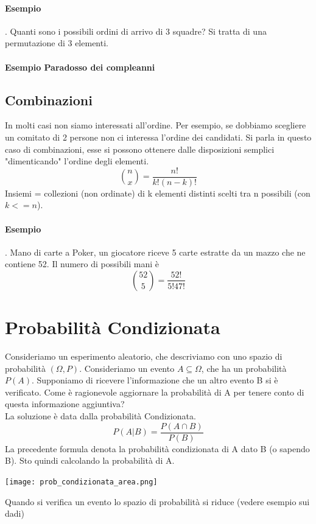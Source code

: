 \documentclass[12pt, a4paper, openany]{book}
\begin{document}
\paragraph{Esempio}. Quanti sono i possibili ordini di arrivo di 3 squadre?
Si tratta di una permutazione di 3 elementi.
\paragraph{Esempio Paradosso dei compleanni}

\subsection{Combinazioni}
In molti casi non siamo interessati all'ordine. 
Per esempio, se dobbiamo scegliere un comitato di 2 persone non ci interessa l'ordine 
dei candidati.
Si parla in questo caso di combinazioni, esse si possono ottenere dalle disposizioni semplici
"dimenticando" l'ordine degli elementi.
\begin{equation}
    {n \choose x} = \frac{n!}{k!(n-k)!}
\end{equation}
Insiemi = collezioni (non ordinate) di k elementi distinti scelti tra n possibili (con $k <= n$).
\paragraph{Esempio}. Mano di carte a Poker, un giocatore riceve 5 carte estratte da un mazzo che
ne contiene 52. Il numero di possibili mani è
\begin{equation}
    {52 \choose 5} = \frac{52!}{5!47!}
\end{equation} 

\section{Probabilità Condizionata}
Consideriamo un esperimento aleatorio, che descriviamo con uno spazio di probabilità $(\Omega, P)$.
Consideriamo un evento $A \subseteq \Omega$, che ha un probabilità $P(A)$.
Supponiamo di ricevere l'informazione che un altro evento B si è verificato.
Come è ragionevole aggiornare la probabilità di A per tenere conto di questa informazione aggiuntiva?
\\La soluzione è data dalla probabilità Condizionata.
\begin{equation}
    P(A|B) = \frac{P(A \cap B)}{P(B)}
\end{equation}
La precedente formula denota la probabilità condizionata di A dato B (o sapendo B).
Sto quindi calcolando la probabilità di A.
\begin{center}
    \texttt{[image: prob\_condizionata\_area.png]}    
\end{center}
Quando si verifica un evento lo spazio di probabilità si riduce (vedere esempio sui dadi)
\end{document}
